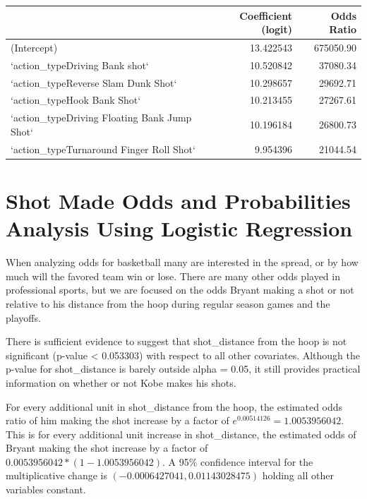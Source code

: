 \documentclass[american,]{article}
\begin{document}
\begin{table}[H]
\centering
\begin{tabular}{lrr}
\toprule
  & Coefficient (logit) & Odds Ratio\\
\midrule
\rowcolor{gray!6}  (Intercept) & 13.422543 & 675050.90\\
`action\_typeDriving Bank shot` & 10.520842 & 37080.34\\
\rowcolor{gray!6}  `action\_typeReverse Slam Dunk Shot` & 10.298657 & 29692.71\\
`action\_typeHook Bank Shot` & 10.213455 & 27267.61\\
\rowcolor{gray!6}  `action\_typeDriving Floating Bank Jump Shot` & 10.196184 & 26800.73\\
\addlinespace
`action\_typeTurnaround Finger Roll Shot` & 9.954396 & 21044.54\\
\bottomrule
\end{tabular}
\end{table}

\hypertarget{shot-made-odds-and-probabilities-analysis-using-logistic-regression}{%
\section{\texorpdfstring{\textbf{Shot Made Odds and Probabilities Analysis Using Logistic Regression}}{Shot Made Odds and Probabilities Analysis Using Logistic Regression}}\label{shot-made-odds-and-probabilities-analysis-using-logistic-regression}}

When analyzing odds for basketball many are interested in the spread, or by how much will the favored team win or lose. There are many other odds played in professional sports, but we are focused on the odds Bryant making a shot or not relative to his distance from the hoop during regular season games and the playoffs.

There is sufficient evidence to suggest that shot\_distance from the hoop is not significant (p-value \textless{} 0.053303) with respect to all other covariates. Although the p-value for shot\_distance is barely outside alpha = 0.05, it still provides practical information on whether or not Kobe makes his shots.

For every additional unit in shot\_distance from the hoop, the estimated odds ratio of him making the shot increase by a factor of \(e^0.00514126=1.0053956042\). This is for every additional unit increase in shot\_distance, the estimated odds of Bryant making the shot increase by a factor of \(0.0053956042*(1-1.0053956042)\). A 95\% confidence interval for the multiplicative change is \((-0.0006427041, 0.01143028475)\) holding all other variables constant.
\end{document}
